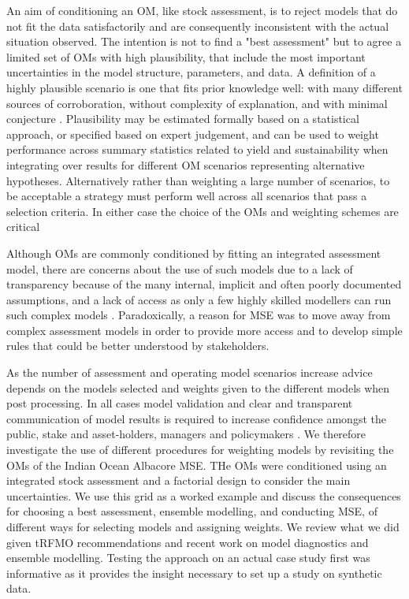 \documentclass[a4paper]{article}
\begin{document}
An aim of conditioning an OM, like stock assessment, is to reject models that do not fit the data satisfactorily and are consequently inconsistent with the actual situation observed. The intention is not to find a "best assessment" but to agree a limited set of OMs with high plausibility, that include the most important uncertainties in the model structure, parameters, and data. A definition of a highly plausible scenario is one that fits prior knowledge well: with many different sources of corroboration, without complexity of explanation, and with minimal conjecture \citep{Connell2006model}. Plausibility may be estimated formally based on a statistical approach, or specified based on expert judgement, and can be used to weight performance across summary statistics related to yield and sustainability when integrating over results for different OM scenarios representing alternative hypotheses. Alternatively rather than weighting a large number of scenarios, to be acceptable a strategy must perform well across all scenarios that pass a selection criteria. 
In either case the choice of the OMs and weighting schemes are critical %

Although OMs are commonly conditioned by fitting an integrated assessment model, there are concerns about the use of such models due to a lack of transparency because of the many internal, implicit and often poorly documented assumptions, and a lack of access as only a few highly skilled modellers can run such complex models \citep{hilborn2003state}. Paradoxically, a reason for MSE was to move away from complex assessment models in order to provide more access and to develop simple rules that could be better understood by stakeholders. 

As the number of assessment and operating model scenarios increase advice depends on the models selected and weights given to the different models when post processing. In all cases model validation and clear and transparent communication of model results is required to increase confidence amongst the public, stake and asset-holders, managers and policymakers \citep[][]{saltelli2020five}. We therefore investigate the use of different procedures for weighting models by revisiting the OMs of the Indian Ocean Albacore MSE. THe OMs were conditioned using an integrated stock assessment and a factorial design to consider the main uncertainties. We use this grid as a worked example and discuss the consequences for choosing a best assessment, ensemble modelling, and conducting MSE, of different ways for selecting models and assigning weights. We review what we did given tRFMO recommendations and recent work on model diagnostics and ensemble modelling. Testing the approach on an actual case study first was informative as it provides the insight necessary to set up a study on synthetic data. 
\end{document}
